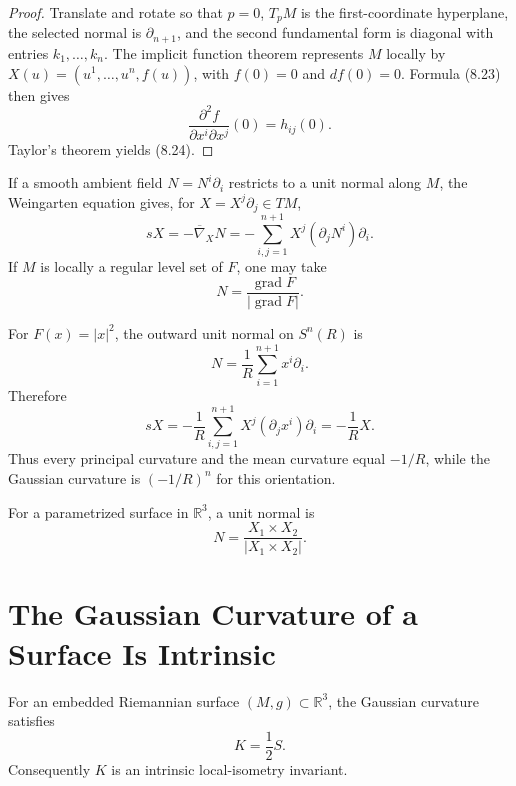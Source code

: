 \begin{proof}
\sketch
Translate and rotate so that $p=0$, $T_pM$ is the first-coordinate
hyperplane, the selected normal is $\partial_{n+1}$, and the second
fundamental form is diagonal with entries $k_1,\ldots,k_n$.  The implicit
function theorem represents $M$ locally by
$X(u)=(u^1,\ldots,u^n,f(u))$, with $f(0)=0$ and $df(0)=0$.  Formula (8.23)
then gives
\[
\frac{\partial^2f}{\partial x^i\partial x^j}(0)=h_{ij}(0).
\]
Taylor's theorem yields (8.24).
\end{proof}

If a smooth ambient field $N=N^i\partial_i$ restricts to a unit normal along
$M$, the Weingarten equation gives, for
$X=X^j\partial_j\in TM$,
\begin{equation}
sX=-\overline\nabla_XN
=-\sum_{i,j=1}^{n+1}X^j(\partial_jN^i)\partial_i. \tag{8.25}
\end{equation}
If $M$ is locally a regular level set of $F$, one may take
\[
N=\frac{\operatorname{grad}F}{|\operatorname{grad}F|}.
\]

\begin{example}
\label{ex:shape-operators-spheres}
For $F(x)=|x|^2$, the outward unit normal on $S^n(R)$ is
\[
N=\frac1R\sum_{i=1}^{n+1}x^i\partial_i.
\]
Therefore
\[
sX=-\frac1R\sum_{i,j=1}^{n+1}X^j(\partial_jx^i)\partial_i
=-\frac1RX.
\]
Thus every principal curvature and the mean curvature equal $-1/R$, while
the Gaussian curvature is $(-1/R)^n$ for this orientation.
\end{example}

For a parametrized surface in $\mathbb R^3$, a unit normal is
\begin{equation}
N=\frac{X_1\times X_2}{|X_1\times X_2|}. \tag{8.26}
\end{equation}

\section{The Gaussian Curvature of a Surface Is Intrinsic}

\begin{theorem}
\label{thm:theorema-egregium}
For an embedded Riemannian surface $(M,g)\subset\mathbb R^3$, the Gaussian
curvature satisfies
\[
K=\frac12S.
\]
Consequently $K$ is an intrinsic local-isometry invariant.
\end{theorem}

